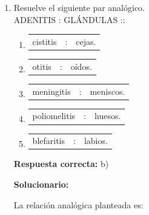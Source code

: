 \begin{enumerate}[resume]
	Revisemos por qué las demás no son las mejores:
	
	\begin{itemize}[label=--]
		\item a) \textit{ya que -- y}: el segundo conector solo suma, pero no expresa restricción.
		\item b) \textit{pues -- por el contrario}: el segundo establece oposición muy fuerte, no una concesión.
		\item c) \textit{en tanto -- en consecuencia}: el segundo indica resultado, lo cual no corresponde.
		\item d) \textit{pero -- no obstante}: ambos son adversativos; el primero no expresa adecuadamente la causa.
	\end{itemize}
	
	Por lo tanto, la alternativa correcta es \textbf{e)}.
	
	\vspace{6mm}
	
	\item Resuelve el siguiente par analógico.\\
	ADENITIS : GLÁNDULAS ::
	
	\begin{enumerate}[label=\alph*)]
		\item \begin{tabular}{p{2.5cm} cp{3cm}} cistitis & : & cejas. \end{tabular}
		\item \begin{tabular}{p{2.5cm} cp{3cm}} otitis & : & oídos. \end{tabular}
		\item \begin{tabular}{p{2.5cm} cp{3cm}} meningitis & : & meniscos. \end{tabular}
		\item \begin{tabular}{p{2.5cm} cp{3cm}} poliomelitis & : & huesos. \end{tabular}
		\item \begin{tabular}{p{2.5cm} cp{3cm}} blefaritis & : & labios. \end{tabular}
	\end{enumerate}
	
	\textbf{Respuesta correcta:} b)
	
	\vspace{2mm}
	\textbf{Solucionario:}
	
	La relación analógica planteada es:
	

\end{enumerate}
